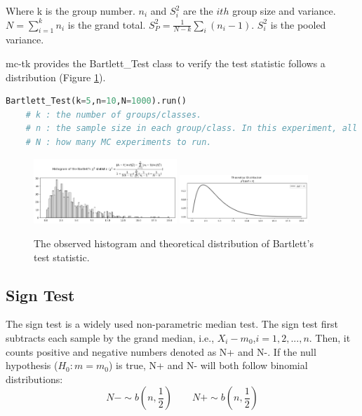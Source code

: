 \documentclass[11pt, letterpaper]{article}
\begin{document}
Where k is the group number. $n_{i}$ and $S_{i}^2$ are the $i{th}$ group size and variance.
$N=\sum_{i=1}^{k}n_{i}$ is the grand total. $S_{P}^{2}=\frac{1}{N-k}\sum_{i}(n_{i}-1)$. $S_{i}^2$ is the pooled variance.

mc-tk provides the Bartlett\_Test class to verify the test statistic follows a distribution (Figure \ref{fig: bartlett mc}).

\lstset{
    basicstyle=\footnotesize,
    xleftmargin=-1em,aboveskip=0.5em,belowskip=0.5em
}
\begin{lstlisting}[language=python]
    Bartlett_Test(k=5,n=10,N=1000).run()
    # k : the number of groups/classes.
    # n : the sample size in each group/class. In this experiment, all group sizes are equal.     
    # N : how many MC experiments to run.
    \end{lstlisting}

\begin{figure}[htbp]
    \centering
    \includegraphics[width=0.48\textwidth]{fig13-bartlett mc1.png}
    \includegraphics[width=0.43\textwidth]{fig13-bartlett mc2.png}
    \caption{The observed histogram and theoretical distribution of Bartlett's test statistic.}
    \label{fig: bartlett mc}
\end{figure}

\subsection{Sign Test}
The sign test is a widely used non-parametric median test. The sign test first subtracts each sample
by the grand median, i.e., $X_{i}-m_{0}$,$i=1,2,...,n$. Then, it counts positive and negative numbers
denoted as N+ and N-. If the null hypothesis ($H_{0}:m=m_{0}$) is true, N+ and N- will both follow
binomial distributions:
\begin{equation}
    \label{deqn_ex12}
    N- \sim b(n,\frac{1}{2}) \qquad  N+ \sim b(n,\frac{1}{2})
\end{equation}
\end{document}
